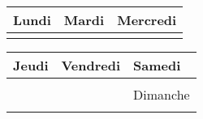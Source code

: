 \documentclass[11pt,a6paper,landscape]{article} %
\newlength{\blankcellsheight}
\newlength{\daycellwidth}
\begin{document}
\begin{tabular}{|*{3}{p{\daycellwidth}|}} \hline
Lundi & Mardi & Mercredi \\ \hline
\vspace{\blankcellsheight}\phantom{x} & & \\ \hline
\end{tabular}

\begin{tabular}{|*{3}{p{\daycellwidth}|}} \hline
Jeudi & Vendredi & Samedi \\ \hline
\vspace{0.5\blankcellsheight}\phantom{x} & & \\ \cline{3-3}
         &        & Dimanche \\ \cline{3-3}
\vspace{0.5\blankcellsheight}\phantom{x} & & \\ \hline
\end{tabular}
\end{document}
